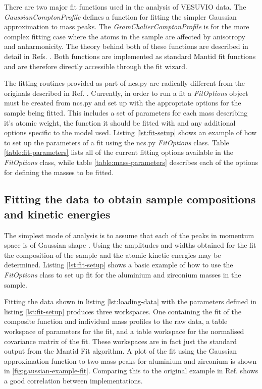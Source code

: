 \documentclass[paper=a4, fontsize=11pt]{scrartcl}	%
\numberwithin{equation}{section}															%
\numberwithin{figure}{section}																%
\numberwithin{table}{section}
\begin{document}
There are two major fit functions used in the analysis of VESUVIO data. The \textit{GaussianComptonProfile} defines a function for fitting the simpler Gaussian approximation to mass peaks. The \textit{GramChalierComptonProfile} is for the more complex fitting case where the atoms in the sample are affected by anisotropy and anharmonicity. The theory behind both of these functions are described in detail in Refs. \cite{mayers2012vesuvio, andreani2005measurement}. Both functions are implemented as standard Mantid fit functions and are therefore directly accessible through the fit wizard.

The fitting routines provided as part of ncs.py are radically different from the originals described in Ref. \cite{mayers2010user}. Currently, in order to run a fit a \textit{FitOptions} object must be created from ncs.py and set up with the appropriate options for the sample being fitted. This includes a set of parameters for each mass describing it's atomic weight, the function it should be fitted with and any additional options specific to the model used. Listing \ref{lst:fit-setup} shows an example of how to set up the parameters of a fit using the ncs.py \textit{FitOptions} class. Table \ref{table:fit-parameters} lists all of the current fitting options available in the \textit{FitOptions} class, while table \ref{table:mass-parameters} describes each of the options for defining the masses to be fitted.

\subsection{Fitting the data to obtain sample compositions and kinetic energies}
\label{subsec:fitting-composition-kinetic}

The simplest mode of analysis is to assume that each of the peaks in momentum space is of Gaussian shape \cite{mayers2004vesuvio}. Using the amplitudes and widths obtained for the fit the composition of the sample and the atomic kinetic energies may be determined. Listing \ref{lst:fit-setup} shows a basic example of how to use the \textit{FitOptions} class to set up fit for the aluminium and zirconium masses in the sample.

Fitting the data shown in listing \ref{lst:loading-data} with the parameters defined in listing \ref{lst:fit-setup} produces three workspaces. One containing the fit of the composite function and individual mass profiles to the raw data, a table workspace of parameters for the fit, and a table workspace for the normalised covariance matrix of the fit. These workspaces are in fact just the standard output from the Mantid Fit algorithm. A plot of the fit using the Gaussian approximation function to two mass peaks for aluminium and zirconium is shown in \ref{fig:gaussian-example-fit}. Comparing this to the original example in Ref. \cite{mayers2010user} shows a good correlation between implementations.
\end{document}
